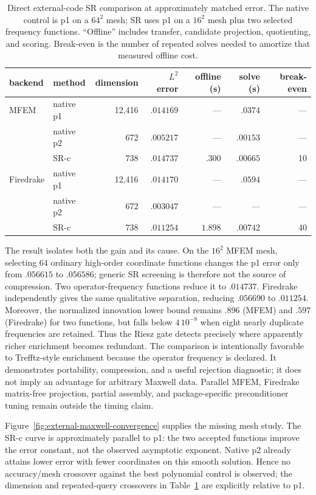 \documentclass[11pt]{article}
\numberwithin{algorithm}{section}
\theoremstyle{definition}\newtheorem{definition}[theorem]{Definition}
\theoremstyle{remark}\newtheorem{remark}[theorem]{Remark}
\begin{document}
\begin{table}[H]
\centering
\caption{Direct external-code SR comparison at approximately matched error.
The native control is p1 on a $64^2$ mesh; SR uses p1 on a $16^2$ mesh plus
two selected frequency functions.  ``Offline'' includes transfer, candidate
projection, quotienting, and scoring.  Break-even is the number of repeated
solves needed to amortize that measured offline cost.}
\label{tab:external-direct-sr}
\begin{tabular}{llrrrrr}
\toprule
backend & method & dimension & $L^2$ error & offline (s) & solve (s) & break-even\\
\midrule
MFEM & native p1 & 12,416 & $.014169$ & --- & $.0374$ & ---\\
     & native p2 & 672 & $.005217$ & --- & $.00153$ & ---\\
     & SR-c       &    738 & $.014737$ & $.300$ & $.00665$ & 10\\
Firedrake & native p1 & 12,416 & $.014170$ & --- & $.0594$ & ---\\
          & native p2 & 672 & $.003047$ & --- & --- & ---\\
          & SR-c       &    738 & $.011254$ & $1.898$ & $.00742$ & 40\\
\bottomrule
\end{tabular}
\end{table}

The result isolates both the gain and its cause.  On the $16^2$ MFEM mesh,
selecting 64 ordinary high-order coordinate functions changes the p1 error
only from $.056615$ to $.056586$; generic SR screening is therefore not the
source of compression.  Two operator-frequency functions reduce it to
$.014737$.  Firedrake independently gives the same qualitative separation,
reducing $.056690$ to $.011254$.  Moreover, the normalized innovation lower
bound remains $.896$ (MFEM) and $.597$ (Firedrake) for two functions, but
falls below $4\,10^{-8}$ when eight nearly duplicate frequencies are retained.
Thus the Riesz gate detects precisely where apparently richer enrichment
becomes redundant.  The comparison is intentionally favorable to
Trefftz-style enrichment because the operator frequency is declared.  It
demonstrates portability, compression, and a useful rejection diagnostic; it
does not imply an advantage for arbitrary Maxwell data.  Parallel MFEM,
Firedrake matrix-free projection, partial assembly, and package-specific
preconditioner tuning remain outside the timing claim.

Figure~\ref{fig:external-maxwell-convergence} supplies the missing mesh study.
The SR-c curve is approximately parallel to p1: the two accepted functions
improve the error constant, not the observed asymptotic exponent.  Native p2
already attains lower error with fewer coordinates on this smooth solution.
Hence no accuracy/mesh crossover against the best polynomial control is
observed; the dimension and repeated-query crossovers in
Table~\ref{tab:external-direct-sr} are explicitly relative to p1.
\end{document}
